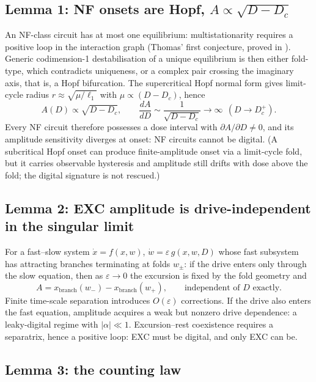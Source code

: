 \documentclass[11pt,a4paper]{article}
\begin{document}
\subsection{Lemma 1: NF onsets are Hopf, $A\propto\sqrt{D-D_c}$}

An NF-class circuit has at most one equilibrium: multistationarity requires a positive loop in the interaction graph (Thomas' first conjecture, proved in \cite{Soule2003,Gouze1998}). Generic codimension-1 destabilisation of a unique equilibrium is then either fold-type, which contradicts uniqueness, or a complex pair crossing the imaginary axis, that is, a Hopf bifurcation. The supercritical Hopf normal form gives limit-cycle radius $r\approx\sqrt{\mu/\ell_1}$ with $\mu\propto(D-D_c)$, hence
\begin{equation}
A(D)\propto\sqrt{D-D_c},
\qquad
\frac{dA}{dD}\sim\frac{1}{\sqrt{D-D_c}}\to\infty\ \ (D\to D_c^+).
\label{eq:hopf}
\end{equation}
Every NF circuit therefore possesses a dose interval with $\partial A/\partial D\neq0$, and its amplitude sensitivity diverges at onset: NF circuits cannot be digital. (A subcritical Hopf onset can produce finite-amplitude onset via a limit-cycle fold, but it carries observable hysteresis and amplitude still drifts with dose above the fold; the digital signature is not rescued.)

\subsection{Lemma 2: EXC amplitude is drive-independent in the singular limit}

For a fast--slow system $\dot x=f(x,w)$, $\dot w=\varepsilon\,g(x,w,D)$ whose fast subsystem has attracting branches terminating at folds $w_\pm$: if the drive enters only through the slow equation, then as $\varepsilon\to0$ the excursion is fixed by the fold geometry and
\begin{equation}
A=x_{\mathrm{branch}}(w_-)-x_{\mathrm{branch}}(w_+),
\qquad\text{independent of } D \text{ exactly.}
\label{eq:exc}
\end{equation}
Finite time-scale separation introduces $O(\varepsilon)$ corrections. If the drive also enters the fast equation, amplitude acquires a weak but nonzero drive dependence: a leaky-digital regime with $|\alpha|\ll1$. Excursion--rest coexistence requires a separatrix, hence a positive loop: EXC must be digital, and only EXC can be.

\subsection{Lemma 3: the counting law}
\end{document}
